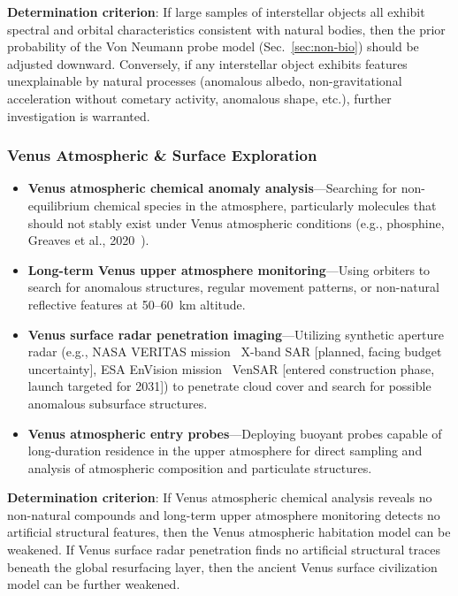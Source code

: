 \documentclass[aps,prd,twocolumn,superscriptaddress,nofootinbib]{revtex4-2}
\begin{document}
\textbf{Determination criterion}: If large samples of interstellar objects all exhibit spectral and orbital characteristics consistent with natural bodies, then the prior probability of the Von Neumann probe model (Sec.~\ref{sec:non-bio}) should be adjusted downward. Conversely, if any interstellar object exhibits features unexplainable by natural processes (anomalous albedo, non-gravitational acceleration without cometary activity, anomalous shape, etc.), further investigation is warranted.

\subsubsection{Venus Atmospheric \& Surface Exploration}\label{sec:venus-exploration}

\begin{itemize}
  \item \textbf{Venus atmospheric chemical anomaly analysis}---Searching for non-equilibrium chemical species in the atmosphere, particularly molecules that should not stably exist under Venus atmospheric conditions (e.g., phosphine, Greaves et al., 2020~\cite{Greaves2021}).
  \item \textbf{Long-term Venus upper atmosphere monitoring}---Using orbiters to search for anomalous structures, regular movement patterns, or non-natural reflective features at 50--60~km altitude.
  \item \textbf{Venus surface radar penetration imaging}---Utilizing synthetic aperture radar (e.g., NASA VERITAS mission~\cite{NASA_VERITAS} X-band SAR [planned, facing budget uncertainty], ESA EnVision mission~\cite{ESA_EnVision} VenSAR [entered construction phase, launch targeted for 2031]) to penetrate cloud cover and search for possible anomalous subsurface structures.
  \item \textbf{Venus atmospheric entry probes}---Deploying buoyant probes capable of long-duration residence in the upper atmosphere for direct sampling and analysis of atmospheric composition and particulate structures.
\end{itemize}

\textbf{Determination criterion}: If Venus atmospheric chemical analysis reveals no non-natural compounds and long-term upper atmosphere monitoring detects no artificial structural features, then the Venus atmospheric habitation model can be weakened. If Venus surface radar penetration finds no artificial structural traces beneath the global resurfacing layer, then the ancient Venus surface civilization model can be further weakened.
\end{document}

